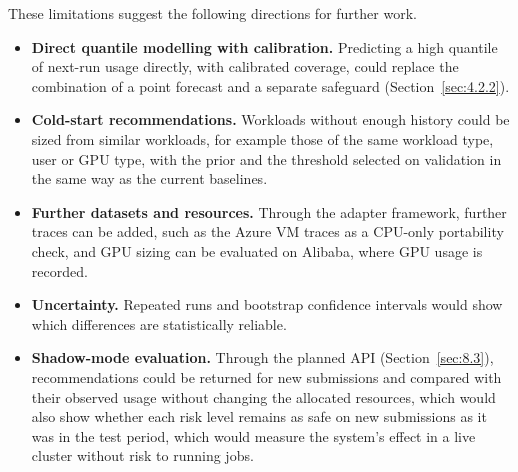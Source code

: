 \documentclass{IEEEtran}
\providecommand{\tightlist}{\setlength{\itemsep}{0pt}\setlength{\parskip}{0pt}}
\begin{document}
These limitations suggest the following directions for further work.

\begin{itemize}
\tightlist
\item
  \textbf{Direct quantile modelling with calibration.} Predicting a high quantile of next-run usage directly, with calibrated coverage, could replace the combination of a point forecast and a separate safeguard (Section~\ref{sec:4.2.2}).
\item
  \textbf{Cold-start recommendations.} Workloads without enough history could be sized from similar workloads, for example those of the same workload type, user or GPU type, with the prior and the threshold selected on validation in the same way as the current baselines.
\item
  \textbf{Further datasets and resources.} Through the adapter framework, further traces can be added, such as the Azure VM traces as a CPU-only portability check, and GPU sizing can be evaluated on Alibaba, where GPU usage is recorded.
\item
  \textbf{Uncertainty.} Repeated runs and bootstrap confidence intervals would show which differences are statistically reliable.
\item
  \textbf{Shadow-mode evaluation.} Through the planned API (Section~\ref{sec:8.3}), recommendations could be returned for new submissions and compared with their observed usage without changing the allocated resources, which would also show whether each risk level remains as safe on new submissions as it was in the test period, which would measure the system's effect in a live cluster without risk to running jobs.
\end{itemize}
\end{document}
